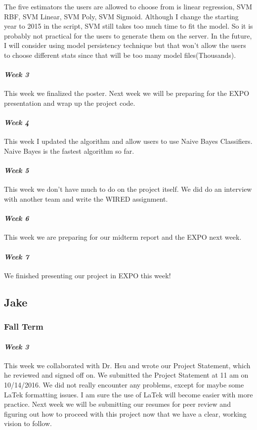 \documentclass[onecolumn, draftclsnofoot,10pt, compsoc]{IEEEtran}
\begin{document}
The five estimators the users are allowed to choose from is linear regression, SVM RBF, SVM Linear, SVM Poly, SVM Sigmoid. Although I change the starting year to 2015 in the script, SVM still takes too much time to fit the model. So it is probably not practical for the users to generate them on the server. In the future, I will consider using model persistency technique but that won't allow the users to choose different stats since that will be too many model files(Thousands).
\paragraph{\emph{Week 3}}
This week we finalized the poster. Next week we will be preparing for the EXPO presentation and wrap up the project code.
\paragraph{\emph{Week 4}}
This week I updated the algorithm and allow users to use Naive Bayes Classifiers. Naive Bayes is the fastest algorithm so far.
\paragraph{\emph{Week 5}}
This week we don't have much to do on the project itself. We did do an interview with another team and write the WIRED assignment.
\paragraph{\emph{Week 6}}
This week we are preparing for our midterm report and the EXPO next week.
\paragraph{\emph{Week 7}}
We finished presenting our project in EXPO this week!

\subsection{Jake}
\subsubsection{Fall Term}

\paragraph{\emph{Week 3}}
This week we collaborated with Dr. Hsu and wrote our Project Statement, which he reviewed and signed off on. We submitted the Project Statement at 11 am on 10/14/2016. We did not really encounter any problems, except for maybe some LaTek formatting issues. I am sure the use of LaTek will become easier with more practice. Next week we will be submitting our resumes for peer review and figuring out how to proceed with this project now that we have a clear, working vision to follow.
\end{document}
